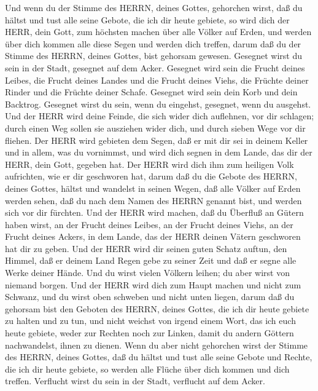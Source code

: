  Und wenn du der Stimme des HERRN, deines Gottes, gehorchen
wirst, daß du hältst und tust alle seine Gebote, die ich dir heute
gebiete, so wird dich der HERR, dein Gott, zum höchsten machen über alle
Völker auf Erden,  und werden über dich kommen alle diese
Segen und werden dich treffen, darum daß du der Stimme des HERRN, deines
Gottes, bist gehorsam gewesen.  Gesegnet wirst du sein in
der Stadt, gesegnet auf dem Acker.  Gesegnet wird sein die
Frucht deines Leibes, die Frucht deines Landes und die Frucht deines
Viehs, die Früchte deiner Rinder und die Früchte deiner Schafe.
 Gesegnet wird sein dein Korb und dein Backtrog.
 Gesegnet wirst du sein, wenn du eingehst, gesegnet, wenn du
ausgehst.  Und der HERR wird deine Feinde, die sich wider
dich auflehnen, vor dir schlagen; durch einen Weg sollen sie ausziehen
wider dich, und durch sieben Wege vor dir fliehen.  Der HERR
wird gebieten dem Segen, daß er mit dir sei in deinem Keller und in
allem, was du vornimmst, und wird dich segnen in dem Lande, das dir der
HERR, dein Gott, gegeben hat.  Der HERR wird dich ihm zum
heiligen Volk aufrichten, wie er dir geschworen hat, darum daß du die
Gebote des HERRN, deines Gottes, hältst und wandelst in seinen Wegen,
 daß alle Völker auf Erden werden sehen, daß du nach dem
Namen des HERRN genannt bist, und werden sich vor dir fürchten.
 Und der HERR wird machen, daß du Überfluß an Gütern haben
wirst, an der Frucht deines Leibes, an der Frucht deines Viehs, an der
Frucht deines Ackers, in dem Lande, das der HERR deinen Vätern
geschworen hat dir zu geben.  Und der HERR wird dir seinen
guten Schatz auftun, den Himmel, daß er deinem Land Regen gebe zu seiner
Zeit und daß er segne alle Werke deiner Hände. Und du wirst vielen
Völkern leihen; du aber wirst von niemand borgen.  Und der
HERR wird dich zum Haupt machen und nicht zum Schwanz, und du wirst oben
schweben und nicht unten liegen, darum daß du gehorsam bist den Geboten
des HERRN, deines Gottes, die ich dir heute gebiete zu halten und zu
tun,  und nicht weichst von irgend einem Wort, das ich euch
heute gebiete, weder zur Rechten noch zur Linken, damit du andern
Göttern nachwandelst, ihnen zu dienen.  Wenn du aber nicht
gehorchen wirst der Stimme des HERRN, deines Gottes, daß du hältst und
tust alle seine Gebote und Rechte, die ich dir heute gebiete, so werden
alle Flüche über dich kommen und dich treffen.  Verflucht
wirst du sein in der Stadt, verflucht auf dem Acker. 
